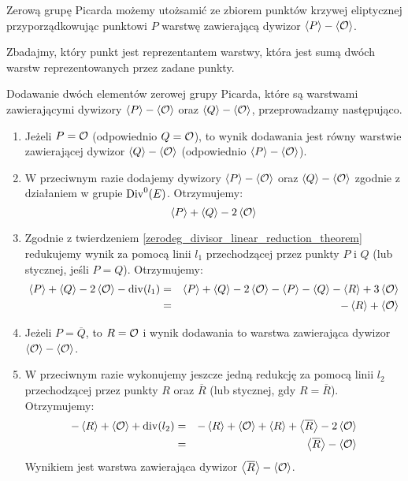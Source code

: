 \begin{corollary}\label{piczero_representants_coro}
Zerową grupę Picarda możemy utożsamić
ze zbiorem punktów krzywej eliptycznej
przyporządkowując punktowi $P$
warstwę zawierającą dywizor $\left\langle P\right\rangle - \left\langle\mathcal{O}\right\rangle$.
\end{corollary}

\noindent
Zbadajmy, który punkt jest reprezentantem warstwy,
która jest sumą dwóch warstw reprezentowanych przez zadane punkty.

\begin{fact}\label{piczero_addition_fact}
Dodawanie dwóch elementów zerowej grupy Picarda,
które są warstwami zawierającymi dywizory
$\left\langle P\right\rangle - \left\langle\mathcal{O}\right\rangle$ oraz $\left\langle Q\right\rangle - \left\langle\mathcal{O}\right\rangle$,
przeprowadzamy następująco.
\begin{enumerate}
\item
Jeżeli $P = \mathcal{O}$ (odpowiednio $Q = \mathcal{O}$),
to wynik dodawania jest równy warstwie zawierającej dywizor
$\left\langle Q\right\rangle - \left\langle\mathcal{O}\right\rangle$ (odpowiednio $\left\langle P\right\rangle - \left\langle\mathcal{O}\right\rangle$).
\item
W przeciwnym razie dodajemy dywizory
$\left\langle P\right\rangle - \left\langle\mathcal{O}\right\rangle$ oraz $\left\langle Q\right\rangle - \left\langle\mathcal{O}\right\rangle$
zgodnie z działaniem w grupie $\operatorname{Div}^0(E)$.
Otrzymujemy:
\begin{equation*}
\left\langle P\right\rangle + \left\langle Q\right\rangle - 2\left\langle\mathcal{O}\right\rangle
\end{equation*}
\item
Zgodnie z twierdzeniem \ref{zerodeg_divisor_linear_reduction_theorem}
redukujemy wynik za pomocą linii $l_1$ przechodzącej przez punkty $P$ i $Q$
(lub stycznej, jeśli $P = Q$).
Otrzymujemy:
\begin{eqnarray*}
\left\langle P\right\rangle + \left\langle Q\right\rangle - 2\left\langle\mathcal{O}\right\rangle - \operatorname{div}(l_1)
& = & \left\langle P\right\rangle + \left\langle Q\right\rangle - 2\left\langle\mathcal{O}\right\rangle
- \left\langle P\right\rangle - \left\langle Q\right\rangle - \left\langle R\right\rangle + 3\left\langle\mathcal{O}\right\rangle
\\ & = &
-\left\langle R\right\rangle + \left\langle\mathcal{O}\right\rangle
\end{eqnarray*}
\item
Jeżeli $P = \overline{Q}$,
to $R = \mathcal{O}$
i wynik dodawania to warstwa
zawierająca dywizor $\left\langle\mathcal{O}\right\rangle - \left\langle\mathcal{O}\right\rangle$.
\item
W przeciwnym razie wykonujemy jeszcze jedną redukcję za pomocą linii $l_2$
przechodzącej przez punkty $R$ oraz $\overline{R}$
(lub stycznej, gdy $R = \overline{R}$).
Otrzymujemy:
\begin{eqnarray*}
-\left\langle R\right\rangle + \left\langle\mathcal{O}\right\rangle + \operatorname{div}(l_2)
& = & -\left\langle R\right\rangle + \left\langle\mathcal{O}\right\rangle
+ \left\langle R\right\rangle + \left\langle\overline{R}\right\rangle - 2\left\langle\mathcal{O}\right\rangle
\\ & = &
\left\langle\overline{R}\right\rangle - \left\langle\mathcal{O}\right\rangle
\end{eqnarray*}
Wynikiem jest warstwa
zawierająca dywizor $\left\langle\overline{R}\right\rangle - \left\langle\mathcal{O}\right\rangle$.
\end{enumerate}
\end{fact}
